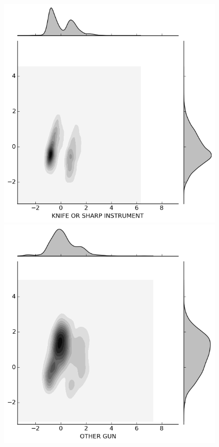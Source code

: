 \begin{figure}[H]
  \begin{minipage}[b]{0.20\linewidth}
    \includegraphics[width=\linewidth]{images/weapon/KNIFE.png}
  \end{minipage}
  \quad
  \begin{minipage}[b]{0.20\linewidth}
    \includegraphics[width=\linewidth]{images/weapon/OTHER_GUN.png}

\end{minipage}
\end{figure}
